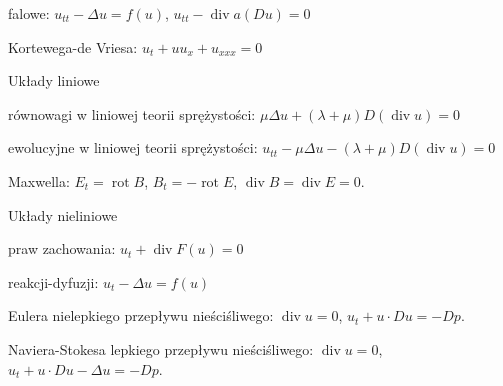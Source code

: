 \begin{multicols*}{2}
\begin{enumx}
\begin{enumx}
	\item falowe: $u_{tt} - \Delta u = f(u)$, $u_{tt} - \operatorname{div} a (Du) = 0$
	\item Kortewega-de Vriesa: $u_t + uu_x + u_{xxx}=0$
	\end{enumx}
\item Układy liniowe
\begin{enumx}
	\item równowagi w liniowej teorii sprężystości: $\mu \Delta u + (\lambda + \mu) D(\operatorname{div} u) = 0$
	\item ewolucyjne w liniowej teorii sprężystości: $u_{tt} - \mu \Delta u - (\lambda+\mu) D(\operatorname{div} u) = 0$
	\item Maxwella: $E_t = \operatorname{rot} B$, $B_t = - \operatorname{rot} E$, $\operatorname{div} B = \operatorname{div} E = 0$.
	\end{enumx}
\item Układy nieliniowe
\begin{enumx}
	\item praw zachowania: $u_t + \operatorname{div} F(u) = 0$
	\item reakcji-dyfuzji: $u_t - \Delta u = f(u)$
	\item Eulera nielepkiego przepływu nieściśliwego: $\operatorname{div} u = 0$, $u_t + u \cdot D u = - Dp$.
	\item Naviera-Stokesa lepkiego przepływu nieściśliwego: $\operatorname{div} u = 0$, $u_t + u \cdot D u - \Delta u = - Dp$.
	\end{enumx}
\end{enumx}

\end{multicols*}
 

